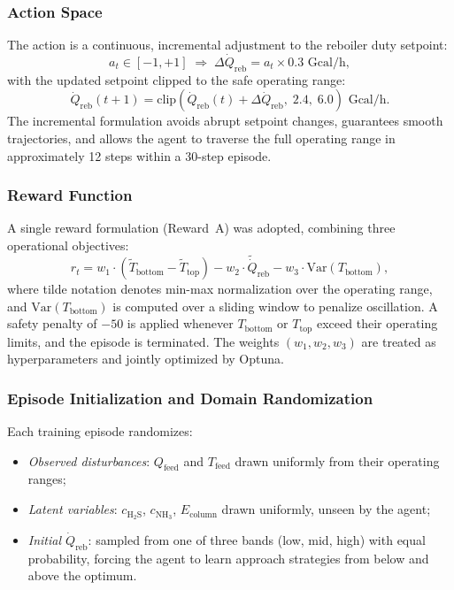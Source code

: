 \documentclass[journal,10pt,twocolumn]{IEEEtran}
\begin{document}
\subsubsection{Action Space}
The action is a continuous, incremental adjustment to the reboiler duty setpoint:
\begin{equation}
  a_t \in [-1,+1] \;\Rightarrow\; \Delta\dot{Q}_\text{reb} = a_t \times 0.3 \text{ Gcal/h},
  \label{eq:action}
\end{equation}
with the updated setpoint clipped to the safe operating range:
\begin{equation}
  \dot{Q}_\text{reb}(t+1) = \text{clip}\!\left(\dot{Q}_\text{reb}(t) + \Delta\dot{Q}_\text{reb},\; 2.4,\; 6.0\right) \text{ Gcal/h}.
  \label{eq:clip}
\end{equation}
The incremental formulation avoids abrupt setpoint changes, guarantees smooth trajectories, and allows the agent to traverse the full operating range in approximately 12 steps within a 30-step episode.

\subsubsection{Reward Function}
A single reward formulation (Reward~A) was adopted, combining three operational objectives:
\begin{equation}
  r_t = w_1 \cdot \left(\tilde{T}_\text{bottom} - \tilde{T}_\text{top}\right)
        - w_2 \cdot \tilde{\dot{Q}}_\text{reb}
        - w_3 \cdot \mathrm{Var}(T_\text{bottom}),
  \label{eq:reward}
\end{equation}
where tilde notation denotes min-max normalization over the operating range, and $\mathrm{Var}(T_\text{bottom})$ is computed over a sliding window to penalize oscillation. A safety penalty of $-50$ is applied whenever $T_\text{bottom}$ or $T_\text{top}$ exceed their operating limits, and the episode is terminated. The weights $(w_1, w_2, w_3)$ are treated as hyperparameters and jointly optimized by Optuna.

\subsubsection{Episode Initialization and Domain Randomization}
Each training episode randomizes:
\begin{itemize}
  \item \emph{Observed disturbances}: $Q_\text{feed}$ and $T_\text{feed}$ drawn uniformly from their operating ranges;
  \item \emph{Latent variables}: $c_\mathrm{H_2S}$, $c_\mathrm{NH_3}$, $E_\text{column}$ drawn uniformly, unseen by the agent;
  \item \emph{Initial $\dot{Q}_\text{reb}$}: sampled from one of three bands (low, mid, high) with equal probability, forcing the agent to learn approach strategies from below and above the optimum.
\end{itemize}
\end{document}
